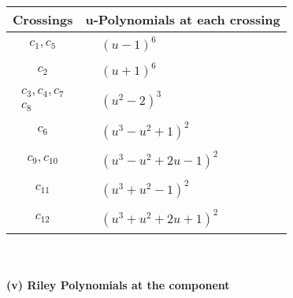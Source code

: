 \documentclass[1p]{elsarticle_modified}
\theoremstyle{definition}
\begin{document}
\begin{tabular}{m{50pt}|m{274pt}}
Crossings & \hspace{64pt}u-Polynomials at each crossing \\
\hline $$\begin{aligned}c_{1},c_{5}\end{aligned}$$&$\begin{aligned}
&(u-1)^6
\end{aligned}$\\
\hline $$\begin{aligned}c_{2}\end{aligned}$$&$\begin{aligned}
&(u+1)^6
\end{aligned}$\\
\hline $$\begin{aligned}c_{3},c_{4},c_{7}\\c_{8}\end{aligned}$$&$\begin{aligned}
&(u^2-2)^3
\end{aligned}$\\
\hline $$\begin{aligned}c_{6}\end{aligned}$$&$\begin{aligned}
&(u^3- u^2+1)^2
\end{aligned}$\\
\hline $$\begin{aligned}c_{9},c_{10}\end{aligned}$$&$\begin{aligned}
&(u^3- u^2+2 u-1)^2
\end{aligned}$\\
\hline $$\begin{aligned}c_{11}\end{aligned}$$&$\begin{aligned}
&(u^3+u^2-1)^2
\end{aligned}$\\
\hline $$\begin{aligned}c_{12}\end{aligned}$$&$\begin{aligned}
&(u^3+u^2+2 u+1)^2
\end{aligned}$\\
\hline
\end{tabular}\\~\\
\newpage\renewcommand{\arraystretch}{1}
\flushleft \textbf{(v) Riley Polynomials at the component}\newline \\
\end{document}
